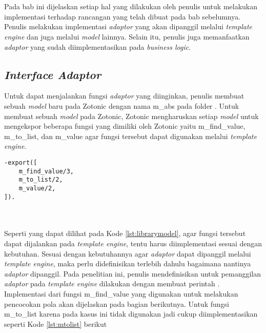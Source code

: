 \chapter{\babEmpat}

Pada bab ini dijelaskan setiap hal yang dilakukan oleh penulis untuk melakukan implementasi terhadap rancangan yang telah dibuat pada bab sebelumnya. Penulis melakukan implementasi \textit{adaptor} yang akan dipanggil melalui \textit{template engine} dan juga melalui \textit{model} lainnya. Selain itu, penulis juga memanfaatkan \textit{adaptor} yang sudah diimplementasikan pada \textit{business logic}.

\section{\textit{Interface Adaptor}}

Untuk dapat menjalankan fungsi \textit{adaptor} yang diinginkan, penulis membuat sebuah \textit{model} baru pada Zotonic dengan nama m\_abs pada folder . Untuk membuat sebuah \textit{model} pada Zotonic, Zotonic mengharuskan setiap \textit{model} untuk mengekspor beberapa fungsi yang dimiliki oleh Zotonic yaitu m\_find\_value, m\_to\_list, dan m\_value agar fungsi tersebut dapat digunakan melalui \textit{template engine}.

\begin{minipage}{\linewidth}
\begin{lstlisting}[caption={Fungsi yang harus diekspor untuk \textit{model}},label={lst:librarymodel}]
-export([
	m_find_value/3,
	m_to_list/2,
	m_value/2,
]).
\end{lstlisting}
\end{minipage}\\\\

Seperti yang dapat dilihat pada Kode \ref{lst:librarymodel}, agar fungsi tersebut dapat dijalankan pada \textit{template engine}, tentu harus diimplementasi sesuai dengan kebutuhan. Sesuai dengan kebutuhannya agar \textit{adaptor} dapat dipanggil melalui \textit{template engine}, maka perlu didefinisikan terlebih dahulu bagaimana nantinya \textit{adaptor} dipanggil. Pada penelitian ini, penulis mendefinisikan untuk pemanggilan \textit{adaptor} pada \textit{template engine} dilakukan dengan membuat perintah . Implementasi dari fungsi m\_find\_value yang digunakan untuk melakukan pencocokan pola akan dijelaskan pada bagian berikutnya. Untuk fungsi m\_to\_list karena pada kasus ini tidak digunakan jadi cukup diimplementasikan seperti Kode \ref{lst:mtolist} berikut

